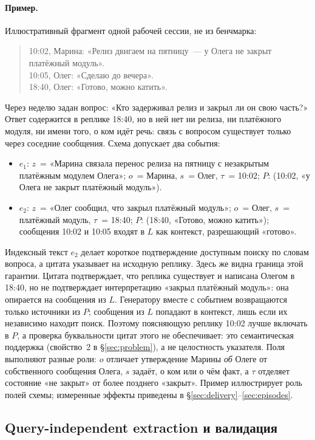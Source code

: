 \documentclass[11pt,a4paper]{article}
\begin{document}
\paragraph{Пример.}
Иллюстративный фрагмент одной рабочей сессии, не из бенчмарка:
\begin{quote}\small
10:02, Марина: «Релиз двигаем на пятницу~--- у Олега не закрыт платёжный модуль».\\
10:05, Олег: «Сделаю до вечера».\\
18:40, Олег: «Готово, можно катить».
\end{quote}
Через неделю задан вопрос: «Кто задерживал релиз и закрыл ли он свою часть?»
Ответ содержится в реплике 18:40, но в ней нет ни релиза, ни платёжного модуля,
ни имени того, о ком идёт речь: связь с вопросом существует только через
соседние сообщения. Схема допускает два события:
\begin{itemize}
\item $e_1$: $z$~= «Марина связала перенос релиза на пятницу с незакрытым
платёжным модулем Олега»; $o$~= Марина, $s$~= Олег, $\tau$~= 10:02;
$P$: (10:02, «у Олега не закрыт платёжный модуль»).
\item $e_2$: $z$~= «Олег сообщил, что закрыл платёжный модуль»; $o$~= Олег,
$s$~= платёжный модуль, $\tau$~= 18:40; $P$: (18:40, «Готово, можно катить»);
сообщения 10:02 и 10:05 входят в $L$ как контекст, разрешающий «готово».
\end{itemize}
Индексный текст $e_2$ делает короткое подтверждение доступным поиску по словам
вопроса, а цитата указывает на исходную реплику. Здесь же видна граница этой
гарантии. Цитата подтверждает, что реплика существует и написана Олегом в 18:40,
но не подтверждает интерпретацию «закрыл платёжный модуль»: она опирается на
сообщения из $L$. Генератору вместе с событием возвращаются только источники из
$P$; сообщения из $L$ попадают в контекст, лишь если их независимо находит
поиск. Поэтому поясняющую реплику 10:02 лучше включать в $P$, а проверка
буквальности цитат этого не обеспечивает: это семантическая поддержка
(свойство~2 в §\ref{sec:problem}), а не целостность указателя. Поля выполняют
разные роли: $o$ отличает утверждение Марины \emph{об} Олеге от собственного
сообщения Олега, $s$ задаёт, о ком или о чём факт, а $\tau$ отделяет состояние
«не закрыт» от более позднего «закрыт». Пример иллюстрирует роль полей схемы;
измеренные эффекты приведены в §\ref{sec:delivery}--\ref{sec:episodes}.

\subsection{Query-independent extraction и валидация}
\end{document}

